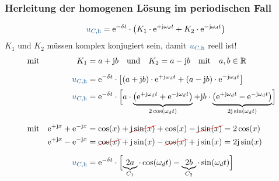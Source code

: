 \subsubsection{Herleitung der homogenen Lösung im periodischen Fall}
\label{sec:schaltvorgaengezeitbereich:exkurse:herleitung}
%
\begin{frame}[t]
\ifvmode\vspace*{-\baselineskip}\setlength{\parskip}{0ex}\fi%
\begin{align}
    &&
        \ecv{u_{C,\mathrm{h}}} &= \mathrm{e}^{-\delta t} \cdot \left( K_1 \cdot \mathrm{e}^{+\mathrm{j}\omega_d t} + K_2 \cdot \mathrm{e}^{-\mathrm{j}\omega_d t} \right) \nonumber\\
\end{align}
$K_1$ und $K_2$ müssen komplex konjugiert sein, damit $\ecv{u_{C,\mathrm{h}}}$ reell ist! 
\begin{align}
&\text{mit}&
        K_1 &= a + \mathrm{j} b \mathrlap{\quad\text{und}\quad K_2 = a - \mathrm{j} b\quad\text{mit}\quad a,b \in \mathbb{R}} \nonumber\\[6pt]
    &&
        \ecv{u_{C,\mathrm{h}}} &= \mathrm{e}^{-\delta t} \cdot \left[ (a + \mathrm{j} b) \cdot \mathrm{e}^{+\mathrm{j}\omega_d t} + (a - \mathrm{j} b) \cdot \mathrm{e}^{-\mathrm{j}\omega_d t} \right] \nonumber\\[2pt]
    &&
        \ecv{u_{C,\mathrm{h}}} &= \mathrm{e}^{-\delta t} \cdot
            \left[\vphantom{\Big|}
            \smash{ a \cdot
            \underbrace{\left(
                \mathrm{e}^{+\mathrm{j}\omega_d t} + \mathrm{e}^{-\mathrm{j}\omega_d t}
            \right)}_{2\cos(\omega_d t)}
            + \mathrm{j} b \cdot
            \underbrace{\left(
                \mathrm{e}^{+\mathrm{j}\omega_d t} - \mathrm{e}^{-\mathrm{j}\omega_d t}
            \right)}_{2\mathrm{j}\sin(\omega_d t)}
            }\right] \nonumber\\[20pt]
    &\text{mit}&
        \mathrm{e}^{+\mathrm{j}x} + \mathrm{e}^{-\mathrm{j}x} &= \cos(x) + \redcancel{\mathrm{j}\sin(x)} + \cos(x) - \redcancel{\mathrm{j}\sin(x)} = 2\cos(x) \nonumber\\
    &&
        \mathrm{e}^{+\mathrm{j}x} - \mathrm{e}^{-\mathrm{j}x} &= \redcancel{\cos(x)} + \mathrm{j}\sin(x) - \redcancel{\cos(x)} + \mathrm{j}\sin(x) = 2\mathrm{j}\sin(x) \nonumber\\[6pt]
    &&
        \ecv{u_{C,\mathrm{h}}} &= \mathrm{e}^{-\delta t} \cdot
            \left[\vphantom{\Big|}\smash{
            \underbrace{2a}_{C_1} \cdot \cos(\omega_d t) - \underbrace{2b}_{C_2} \cdot \sin(\omega_d t)
            }\right]
    \label{eq:dgl:rlc:homolsg:periodisch:herleitung}
\end{align}%
\end{frame}%
